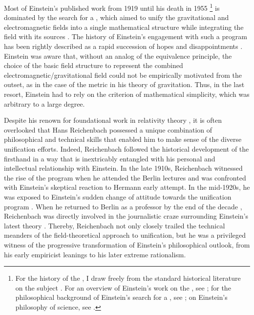\documentclass[final]{article}
\begin{document}
Most of Einstein's published work from 1919 \citep{Einstein1919a} until his death in 1955 \citep{Einstein1955-07}\footnote{For the history of the \uftp, I draw freely from the standard historical literature on the subject \cite{Vizgin1994, Goenner2004, Goldstein2003}. For an overview of Einstein's work on the \uft, see \citet{Sauer2014}; for the philosophical background of Einstein's search for a \uft, see \citet{Dongen2010}; on Einstein's philosophy of science, see \citet{Ryckman2017}.} is dominated by the search for a \uft, which aimed to unify the gravitational and electromagnetic fields into a single mathematical structure while integrating the field with its sources \citep{Tonnelat1966}. The history of Einstein's engagement with such a program has been rightly described as a rapid succession of hopes and disappointments \citep[183ff.]{Vizgin1994}. Einstein was aware that, without an analog of the equivalence principle, the choice of the basic field structure to represent the combined electromagnetic/gravitational field could not be empirically motivated from the outset, as in the case of the metric in his theory of gravitation. Thus, in the last resort, Einstein had to rely on the criterion of mathematical simplicity, which was arbitrary to a large degree.


Despite his renown for foundational work in relativity theory \citep{Reichenbach1920a,Reichenbach1924,Reichenbach1928}, it is often overlooked that Hans Reichenbach possessed a unique combination of philosophical and technical skills that enabled him to make sense of the diverse unification efforts. Indeed, Reichenbach followed the historical development of the \uftp firsthand in a way that is inextricably entangled with his personal and intellectual relationship with Einstein. In the late 1910s, Reichenbach witnessed  the rise of the program when he attended the Berlin lectures and was confronted with Einstein's skeptical reaction to Hermann  early attempt. In the mid-1920s, he was exposed to Einstein's sudden change of attitude towards the unification program \citep[188]{Vizgin1994}. When he returned to Berlin as a professor by the end of the decade , Reichenbach was directly involved in the journalistic craze surrounding Einstein's latest theory \citep{Sauer2006}. Thereby, Reichenbach not only closely trailed the technical meanders of the field-theoretical approach to unification, but he was a privileged witness of the progressive transformation of Einstein's philosophical outlook, from his early empiricist leanings to his later extreme rationalism. 
\end{document}
